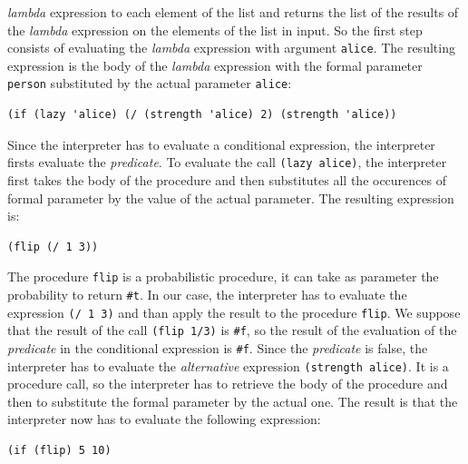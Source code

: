 \begin{itemize}
        \textit{lambda} expression to each element of the list and returns the list of the results of the \textit{lambda}
        expression on the elements of the list in input.
        So the first step consists of evaluating the \textit{lambda} expression with argument \texttt{\textquotesingle alice}. 
        The resulting expression is the body of the \textit{lambda} expression with the formal parameter \texttt{person} substituted 
        by the actual parameter \texttt{\textquotesingle alice}:
        \begin{lstlisting}[caption={Application of \texttt{map} prcedure of Listing~\ref{lst:map}}, 
            captionpos=b, label={lst:lambda-body}]
(if (lazy 'alice) (/ (strength 'alice) 2) (strength 'alice))
        \end{lstlisting}
        Since the interpreter has to evaluate a conditional expression, the interpreter firsts evaluate the \textit{predicate}.
        To evaluate the call \texttt{(lazy \textquotesingle alice)}, the interpreter first takes the body of the procedure and then substitutes
        all the occurences of formal parameter by the value of the actual parameter. The resulting expression is:
        \begin{lstlisting}[caption={Body of procedure \texttt{lazy} when evaluating Listing~\ref{lst:lambda-body}}, captionpos=b]
(flip (/ 1 3))
        \end{lstlisting}
        The procedure \texttt{flip} is a probabilistic procedure, it can take as parameter the probability to return \texttt{\#t}.
        In our case, the interpreter has to evaluate the expression \texttt{(/ 1 3)} and than apply the result to the procedure 
        \texttt{flip}.
        We suppose that the result of the call \texttt{(flip 1/3)} is \texttt{\#f}, so the result of the evaluation of the
        \textit{predicate} in the conditional expression is \texttt{\#f}. Since the \textit{predicate} is false, the interpreter has
        to evaluate the \textit{alternative} expression \texttt{(strength \textquotesingle alice)}.
        It is a procedure call, so the interpreter has to retrieve the body of the procedure and then to substitute the formal
        parameter by the actual one.
        The result is that the interpreter now has to evaluate the following expression:
        \begin{lstlisting}[caption={Body of procedure \texttt{strength} when evaluating Listing~\ref{lst:lambda-body}}, captionpos=b]
(if (flip) 5 10)
        \end{lstlisting}

\end{itemize}
